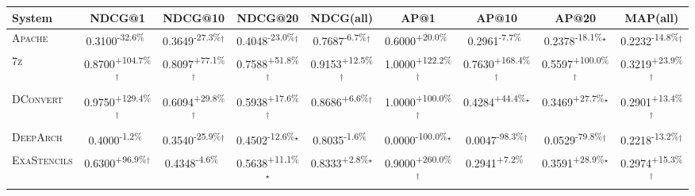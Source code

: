 \begin{table}[htbp]
\centering
\renewcommand{\arraystretch}{1.2}
\begin{tabular}{l|cccc|cccc}
\hline
System & NDCG@1 & NDCG@10 & NDCG@20 & NDCG(all) & AP@1 & AP@10 & AP@20 & MAP(all) \\ \hline
\textsc{Apache} & \cellcolor{red!30}0.3100\textsuperscript{-32.6\%}$^{\,\,\,}$ & \cellcolor{red!30}0.3649\textsuperscript{-27.3\%}$^\dagger$ & \cellcolor{red!30}0.4048\textsuperscript{-23.0\%}$^\dagger$ & \cellcolor{red!30}0.7687\textsuperscript{-6.7\%}$^\dagger$ & \cellcolor{green!30}0.6000\textsuperscript{+20.0\%}$^{\,\,\,}$ & \cellcolor{red!30}0.2961\textsuperscript{-7.7\%}$^{\,\,\,}$ & \cellcolor{red!30}0.2378\textsuperscript{-18.1\%}$^\star$ & \cellcolor{red!30}0.2232\textsuperscript{-14.8\%}$^\dagger$ \\
\textsc{7z} & \cellcolor{green!30}0.8700\textsuperscript{+104.7\%}$^\dagger$ & \cellcolor{green!30}0.8097\textsuperscript{+77.1\%}$^\dagger$ & \cellcolor{green!30}0.7588\textsuperscript{+51.8\%}$^\dagger$ & \cellcolor{green!30}0.9153\textsuperscript{+12.5\%}$^\dagger$ & \cellcolor{green!30}1.0000\textsuperscript{+122.2\%}$^\dagger$ & \cellcolor{green!30}0.7630\textsuperscript{+168.4\%}$^\dagger$ & \cellcolor{green!30}0.5597\textsuperscript{+100.0\%}$^\dagger$ & \cellcolor{green!30}0.3219\textsuperscript{+23.9\%}$^\dagger$ \\
\textsc{DConvert} & \cellcolor{green!30}0.9750\textsuperscript{+129.4\%}$^\dagger$ & \cellcolor{green!30}0.6094\textsuperscript{+29.8\%}$^\dagger$ & \cellcolor{green!30}0.5938\textsuperscript{+17.6\%}$^\dagger$ & \cellcolor{green!30}0.8686\textsuperscript{+6.6\%}$^\dagger$ & \cellcolor{green!30}1.0000\textsuperscript{+100.0\%}$^\dagger$ & \cellcolor{green!30}0.4284\textsuperscript{+44.4\%}$^\star$ & \cellcolor{green!30}0.3469\textsuperscript{+27.7\%}$^\star$ & \cellcolor{green!30}0.2901\textsuperscript{+13.4\%}$^\dagger$ \\
\textsc{DeepArch} & \cellcolor{red!30}0.4000\textsuperscript{-1.2\%}$^{\,\,\,}$ & \cellcolor{red!30}0.3540\textsuperscript{-25.9\%}$^\dagger$ & \cellcolor{red!30}0.4502\textsuperscript{-12.6\%}$^\star$ & \cellcolor{red!30}0.8035\textsuperscript{-1.6\%}$^{\,\,\,}$ & \cellcolor{red!30}0.0000\textsuperscript{-100.0\%}$^\star$ & \cellcolor{red!30}0.0047\textsuperscript{-98.3\%}$^\dagger$ & \cellcolor{red!30}0.0529\textsuperscript{-79.8\%}$^\dagger$ & \cellcolor{red!30}0.2218\textsuperscript{-13.2\%}$^\dagger$ \\
\textsc{ExaStencils} & \cellcolor{green!30}0.6300\textsuperscript{+96.9\%}$^\dagger$ & \cellcolor{red!30}0.4348\textsuperscript{-4.6\%}$^{\,\,\,}$ & \cellcolor{green!30}0.5638\textsuperscript{+11.1\%}$^\star$ & \cellcolor{green!30}0.8333\textsuperscript{+2.8\%}$^\star$ & \cellcolor{green!30}0.9000\textsuperscript{+260.0\%}$^\dagger$ & \cellcolor{green!30}0.2941\textsuperscript{+7.2\%}$^{\,\,\,}$ & \cellcolor{green!30}0.3591\textsuperscript{+28.9\%}$^\star$ & \cellcolor{green!30}0.2974\textsuperscript{+15.3\%}$^\dagger$ \\

\end{tabular}
\end{table}
